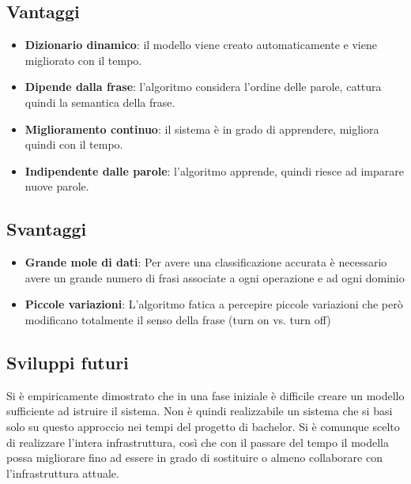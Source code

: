 \documentclass[twoside]{supsistudent}
\begin{document}
\subsection{Vantaggi}
\begin{itemize}
  \item \textbf{Dizionario dinamico}: il modello viene creato automaticamente e viene migliorato con il tempo.
  \item \textbf{Dipende dalla frase}: l'algoritmo considera l'ordine delle parole, cattura quindi la semantica della frase.
  \item \textbf{Miglioramento continuo}: il sistema è in grado di apprendere, migliora quindi con il tempo.
  \item \textbf{Indipendente dalle parole}: l'algoritmo apprende, quindi riesce ad imparare nuove parole.
\end{itemize}
\subsection{Svantaggi}
\begin{itemize}
  \item \textbf{Grande mole di dati}: Per avere una classificazione accurata è necessario avere un grande numero di frasi associate a ogni operazione e ad ogni dominio
  \item \textbf{Piccole variazioni}: L'algoritmo fatica a percepire piccole variazioni che però modificano totalmente il senso della frase (turn on vs. turn off)
\end{itemize}
\subsection{Sviluppi futuri}
Si è empiricamente dimostrato che in una fase iniziale è difficile creare un modello sufficiente ad istruire il sistema. Non è quindi realizzabile un sistema che si basi solo su questo approccio nei tempi del progetto di bachelor. Si è comunque scelto di realizzare l'intera infrastruttura, così che con il passare del tempo il modella possa migliorare fino ad essere in grado di sostituire o almeno collaborare con l'infrastruttura attuale.
\newpage

\end{document}

